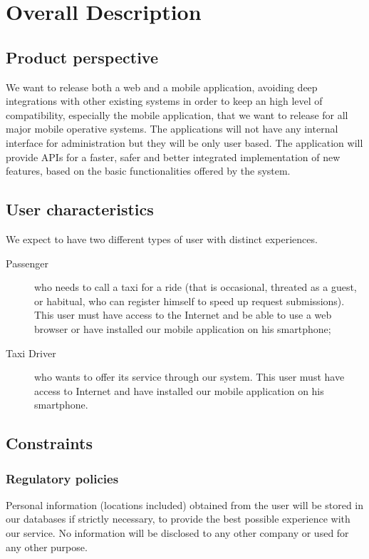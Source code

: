 \section{Overall Description}
	\subsection{Product perspective}
		We want to release both a web and a mobile application, avoiding deep
		integrations with other existing systems in order to keep an high level
		of compatibility, especially the mobile application, that we want to
		release for all major mobile operative systems. The applications will not
		have any internal interface for administration but they will be only user based.
		The application will provide APIs for a faster, safer and better integrated 
		implementation of new features, based on the basic functionalities
		offered by the system.
	\subsection{User characteristics}
		We expect to have two different types of user with distinct experiences. 
		\begin{description}
			\item[Passenger] who needs to call a taxi for a ride (that is occasional, threated
			as a guest, or habitual, who can register himself to speed up request submissions).
			This user must have access to the Internet and be able to use
			a web browser or have installed our mobile application on his smartphone;
			\item[Taxi Driver] who wants to offer its service through our system.
			This user must have access to Internet and have	installed our mobile
			application on his smartphone.
		\end{description}
	\subsection{Constraints}
		\subsubsection{Regulatory policies}
			Personal information (locations included) obtained from the	user will be stored
			in our databases if strictly necessary, to provide the best possible experience
			with our service. No information will be disclosed to any other company or
			used for any other purpose.
